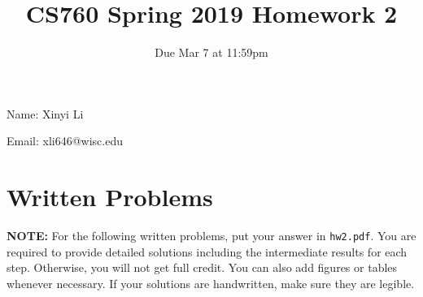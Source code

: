 \documentclass{article}
\title{CS760 Spring 2019 Homework 2}
\author{Due Mar 7 at 11:59pm}
\date{}
\begin{document}
\maketitle



Name: Xinyi Li 

Email: xli646@wisc.edu



\section*{Written Problems}

\textbf{NOTE:} For the following written problems, put your answer in \texttt{hw2.pdf}. You are required to provide detailed solutions including the intermediate results for each step. Otherwise, you will not get full credit. You can also add figures or tables whenever necessary. If your solutions are handwritten, make sure they are legible.
\end{document}
